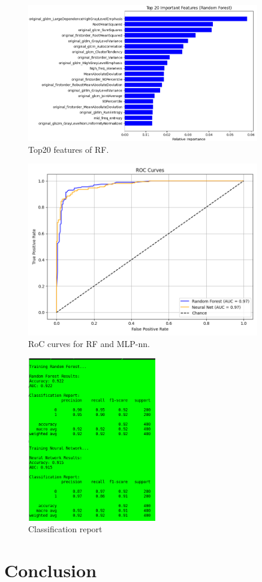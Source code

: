 \documentclass[11pt,a4paper]{report}
\begin{document}
		\begin{figure}[H]
			\centering
			\includegraphics[width=0.9\textwidth]{images/top20features_all_features_rf.png}
			\caption{Top20 features of RF.}
			\label{fig1:}
		\end{figure}		

		\begin{figure}[H]
			\centering
			\includegraphics[width=0.9\textwidth]{images/roc_curves_all_features.png}
			\caption{RoC curves for RF and MLP-nn.}
			\label{fig1:}
		\end{figure}		

		\begin{figure}[H]
			\centering
			\includegraphics[width=0.5\textwidth]{images/report_all_features.png}
			\caption{Classification report}
			\label{fig1:}
		\end{figure}		


	

\chapter{Conclusion}



 
\end{document}
